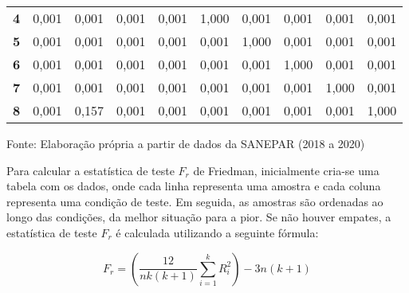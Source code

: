\begin{table}[H]
\begin{tabular}{@{}clllllllll@{}}
		\textbf{4}                           & 0,001                          & 0,001                          & 0,001                          & 0,001                          & 1,000                          & 0,001                          & 0,001                          & 0,001                          & 0,001                          \\
		\textbf{5}                           & 0,001                          & 0,001                          & 0,001                          & 0,001                          & 0,001                          & 1,000                          & 0,001                          & 0,001                          & 0,001                          \\
		\textbf{6}                           & 0,001                          & 0,001                          & 0,001                          & 0,001                          & 0,001                          & 0,001                          & 1,000                          & 0,001                          & 0,001                          \\
		\textbf{7}                           & 0,001                          & 0,001                          & 0,001                          & 0,001                          & 0,001                          & 0,001                          & 0,001                          & 1,000                          & 0,001                          \\
		\textbf{8}                           & 0,001                          & 0,157                          & 0,001                          & 0,001                          & 0,001                          & 0,001                          & 0,001                          & 0,001                          & 1,000                          \\ \bottomrule
	\end{tabular}
	
	Fonte: Elaboração própria a partir de dados da SANEPAR (2018 a 2020)
\end{table}

Para calcular a estatística de teste $F_r$ de Friedman, inicialmente cria-se uma tabela com os dados, onde cada linha representa uma amostra e cada coluna representa uma condição de teste. Em seguida, as amostras são ordenadas ao longo das condições, da melhor situação para a pior. Se não houver empates, a estatística de teste $F_r$ é calculada utilizando a seguinte fórmula:

\begin{equation}
	F_r = \left(\frac{12}{n k(k+1)} \sum_{i=1}^k R_i^2\right) - 3n(k+1)
\end{equation}

